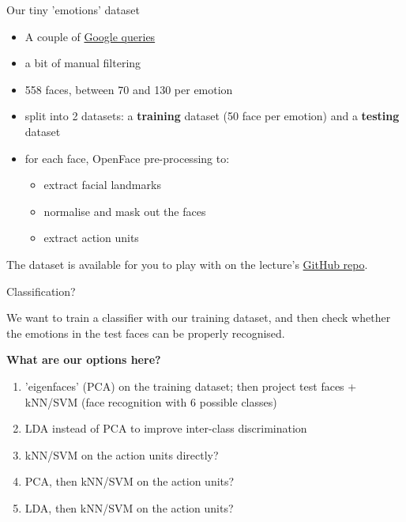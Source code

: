 \documentclass[compress,xcolor=table]{beamer}
\begin{document}
\begin{frame}{Our tiny 'emotions' dataset}
    \begin{itemize}
        \item A couple of \href{https://www.google.co.uk/search?q=human+face+happiness&tbm=isch&source=lnt&tbs=itp:face}{Google queries}
        \item a bit of manual filtering
        \item 558 faces, between 70 and 130 per emotion
        \item split into 2 datasets: a {\bf training} dataset (50 face per
            emotion) and a {\bf testing} dataset
        \item for each face, OpenFace pre-processing to:
            \begin{itemize}
                \item extract facial landmarks
                \item normalise and mask out the faces
                \item extract action units
            \end{itemize}
    \end{itemize}

    The dataset is available for you to play with on the lecture's
    \href{https://github.com/severin-lemaignan/lecture-hri-emotions}{GitHub repo}.
\end{frame}


\begin{frame}{Classification?}

    We want to train a classifier with our training dataset, and then check
    whether the emotions in the test faces can be properly recognised.

    \begin{center}
        {\bf What are our options here?}
    \end{center}

    \pause

    \begin{enumerate}
        \item<+-> 'eigenfaces' (PCA) on the training dataset; then project test
            faces +
            kNN/SVM (\ie face recognition with 6 possible classes)
        \item<+-> LDA instead of PCA to improve inter-class discrimination
        \item<+-> kNN/SVM on the action units directly?
        \item<+-> PCA, then kNN/SVM on the action units?
        \item<+-> LDA, then kNN/SVM on the action units?
    \end{enumerate}
\end{frame}
\end{document}
